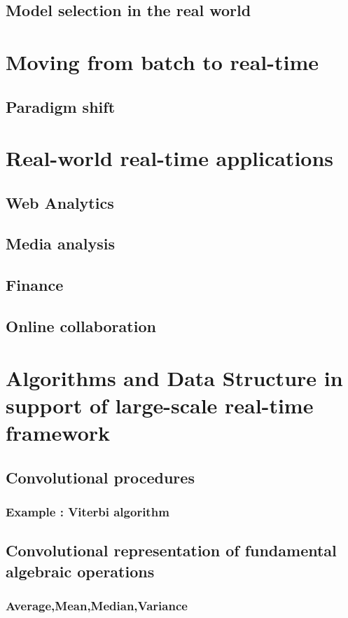 \documentclass[]{book}    %
\begin{document}
\section{Model selection in the real world}

\chapter{Moving from batch to real-time}
\section{Paradigm shift}

\chapter{Real-world real-time applications}
\section{Web Analytics}
\section{Media analysis}
\section{Finance}
\section{Online collaboration}

\chapter{Algorithms and Data Structure in support of large-scale real-time framework}
\section{Convolutional procedures}
\subsection{Example : Viterbi algorithm}

\section{Convolutional representation of fundamental algebraic operations}
\subsection{Average,Mean,Median,Variance}
\end{document}

